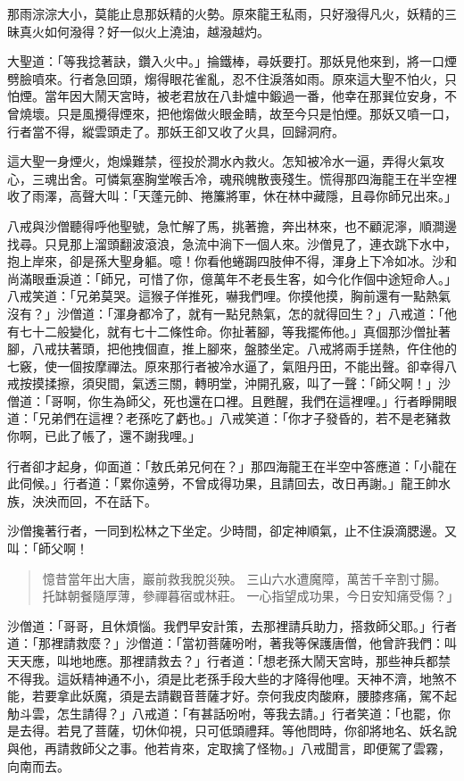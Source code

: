那雨淙淙大小，莫能止息那妖精的火勢。原來龍王私雨，只好潑得凡火，妖精的三昧真火如何潑得？好一似火上澆油，越潑越灼。

大聖道：「等我捻著訣，鑽入火中。」掄鐵棒，尋妖要打。那妖見他來到，將一口煙劈臉噴來。行者急回頭，煼得眼花雀亂，忍不住淚落如雨。原來這大聖不怕火，只怕煙。當年因大鬧天宮時，被老君放在八卦爐中鍛過一番，他幸在那巽位安身，不曾燒壞。只是風攪得煙來，把他煼做火眼金睛，故至今只是怕煙。那妖又噴一口，行者當不得，縱雲頭走了。那妖王卻又收了火具，回歸洞府。

這大聖一身煙火，炮燥難禁，徑投於澗水內救火。怎知被冷水一逼，弄得火氣攻心，三魂出舍。可憐氣塞胸堂喉舌冷，魂飛魄散喪殘生。慌得那四海龍王在半空裡收了雨澤，高聲大叫：「天蓬元帥、捲簾將軍，休在林中藏隱，且尋你師兄出來。」

八戒與沙僧聽得呼他聖號，急忙解了馬，挑著擔，奔出林來，也不顧泥濘，順澗邊找尋。只見那上溜頭翻波滾浪，急流中淌下一個人來。沙僧見了，連衣跳下水中，抱上岸來，卻是孫大聖身軀。噫！你看他蜷跼四肢伸不得，渾身上下冷如冰。沙和尚滿眼垂淚道：「師兄，可惜了你，億萬年不老長生客，如今化作個中途短命人。」八戒笑道：「兄弟莫哭。這猴子佯推死，嚇我們哩。你摸他摸，胸前還有一點熱氣沒有？」沙僧道：「渾身都冷了，就有一點兒熱氣，怎的就得回生？」八戒道：「他有七十二般變化，就有七十二條性命。你扯著腳，等我擺佈他。」真個那沙僧扯著腳，八戒扶著頭，把他拽個直，推上腳來，盤膝坐定。八戒將兩手搓熱，仵住他的七竅，使一個按摩禪法。原來那行者被冷水逼了，氣阻丹田，不能出聲。卻幸得八戒按摸揉擦，須臾間，氣透三關，轉明堂，沖開孔竅，叫了一聲：「師父啊！」沙僧道：「哥啊，你生為師父，死也還在口裡。且甦醒，我們在這裡哩。」行者睜開眼道：「兄弟們在這裡？老孫吃了虧也。」八戒笑道：「你才子發昏的，若不是老豬救你啊，已此了帳了，還不謝我哩。」

行者卻才起身，仰面道：「敖氏弟兄何在？」那四海龍王在半空中答應道：「小龍在此伺候。」行者道：「累你遠勞，不曾成得功果，且請回去，改日再謝。」龍王帥水族，泱泱而回，不在話下。

沙僧攙著行者，一同到松林之下坐定。少時間，卻定神順氣，止不住淚滴腮邊。又叫：「師父啊！
\begin{quote}
憶昔當年出大唐，巖前救我脫災殃。
三山六水遭魔障，萬苦千辛割寸腸。
托缽朝餐隨厚薄，參禪暮宿或林莊。
一心指望成功果，今日安知痛受傷？」
\end{quote}

沙僧道：「哥哥，且休煩惱。我們早安計策，去那裡請兵助力，搭救師父耶。」行者道：「那裡請救麼？」沙僧道：「當初菩薩吩咐，著我等保護唐僧，他曾許我們：叫天天應，叫地地應。那裡請救去？」行者道：「想老孫大鬧天宮時，那些神兵都禁不得我。這妖精神通不小，須是比老孫手段大些的才降得他哩。天神不濟，地煞不能，若要拿此妖魔，須是去請觀音菩薩才好。奈何我皮肉酸麻，腰膝疼痛，駕不起觔斗雲，怎生請得？」八戒道：「有甚話吩咐，等我去請。」行者笑道：「也罷，你是去得。若見了菩薩，切休仰視，只可低頭禮拜。等他問時，你卻將地名、妖名說與他，再請救師父之事。他若肯來，定取擒了怪物。」八戒聞言，即便駕了雲霧，向南而去。

